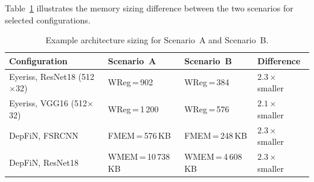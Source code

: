 \noindent
Table~\ref{tab:scenarios-example} illustrates the memory sizing
difference between the two scenarios for selected configurations.

\begin{table}[htbp]
  \centering
  \caption{Example architecture sizing for Scenario~A and Scenario~B.}
  \label{tab:scenarios-example}
  \small
  \begin{tabular}{l l l l}
    \toprule
    \textbf{Configuration}
      & \textbf{Scenario~A}
      & \textbf{Scenario~B}
      & \textbf{Difference} \\
    \midrule
    Eyeriss, ResNet18 (512$\times$32)
      & WReg\,=\,902
      & WReg\,=\,384
      & $2.3\times$ smaller \\
    Eyeriss, VGG16 (512$\times$32)
      & WReg\,=\,1\,200
      & WReg\,=\,576
      & $2.1\times$ smaller \\
    DepFiN, FSRCNN
      & FMEM\,=\,576\,KB
      & FMEM\,=\,248\,KB
      & $2.3\times$ smaller \\
    DepFiN, ResNet18
      & WMEM\,=\,10\,738\,KB
      & WMEM\,=\,4\,608\,KB
      & $2.3\times$ smaller \\
    \bottomrule
  \end{tabular}
\end{table}
